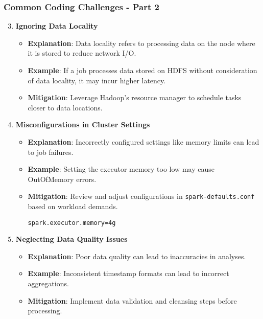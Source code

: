 \documentclass[aspectratio=169]{beamer}
\begin{document}
\begin{frame}[fragile]
    \frametitle{Common Coding Challenges - Part 2}
    \begin{enumerate}
        \setcounter{enumi}{2}
        
        \item \textbf{Ignoring Data Locality}
            \begin{itemize}
                \item \textbf{Explanation}: Data locality refers to processing data on the node where it is stored to reduce network I/O.
                \item \textbf{Example}: If a job processes data stored on HDFS without consideration of data locality, it may incur higher latency.
                \item \textbf{Mitigation}: Leverage Hadoop's resource manager to schedule tasks closer to data locations.
            \end{itemize}
        
        \item \textbf{Misconfigurations in Cluster Settings}
            \begin{itemize}
                \item \textbf{Explanation}: Incorrectly configured settings like memory limits can lead to job failures.
                \item \textbf{Example}: Setting the executor memory too low may cause OutOfMemory errors.
                \item \textbf{Mitigation}: Review and adjust configurations in \texttt{spark-defaults.conf} based on workload demands.
                \begin{lstlisting}
spark.executor.memory=4g
                \end{lstlisting}
            \end{itemize}
        
        \item \textbf{Neglecting Data Quality Issues}
            \begin{itemize}
                \item \textbf{Explanation}: Poor data quality can lead to inaccuracies in analyses.
                \item \textbf{Example}: Inconsistent timestamp formats can lead to incorrect aggregations.
                \item \textbf{Mitigation}: Implement data validation and cleansing steps before processing.
            \end{itemize}
    \end{enumerate}
\end{frame}
\end{document}
